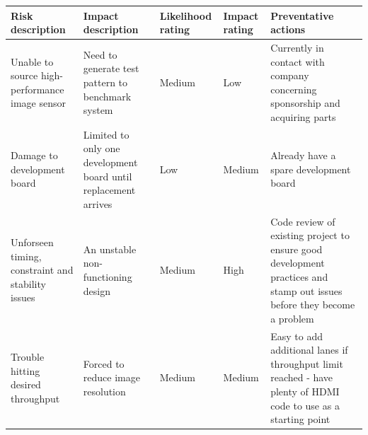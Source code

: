 \documentclass[a4paper]{report}
\begin{document}
\begin{table}[h]
  \centering
  \small
  \begin{tabular}{p{3cm}p{3cm}p{1cm}p{1cm}p{3cm}}
  Risk description                                  & Impact description                                              & Likelihood rating & Impact rating & Preventative actions                                                                                                   \\
  \hline
  Unable to source high-performance image sensor    & Need to generate test pattern to benchmark system               & Medium            & Low           & Currently in contact with company concerning sponsorship and acquiring parts                                           \\
  Damage to development board                       & Limited to only one development board until replacement arrives & Low               & Medium        & Already have a spare development board                                                                                 \\
  Unforseen timing, constraint and stability issues & An unstable non-functioning design                              & Medium            & High          & Code review of existing project to ensure good development practices and stamp out issues before they become a problem \\
  Trouble hitting desired throughput                & Forced to reduce image resolution                               & Medium            & Medium        & Easy to add additional lanes if throughput limit reached - have plenty of HDMI code to use as a starting point        
  \end{tabular}
\end{table}
\end{document}
